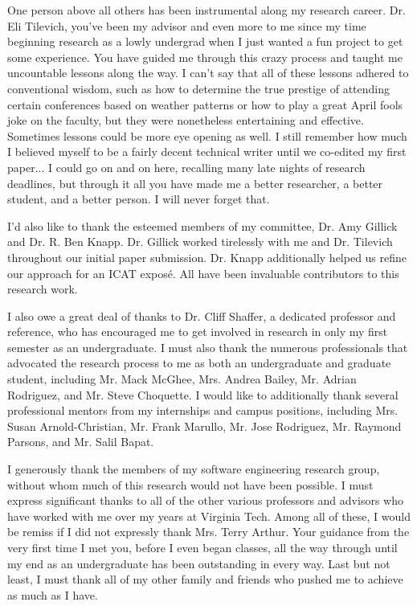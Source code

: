 \documentclass[12pt]{report}
\begin{document}
One person above all others has been instrumental along my research career. Dr. Eli Tilevich, you've been my advisor and even more to me since my time beginning research as a lowly undergrad when I just wanted a fun project to get some experience. You have guided me through this crazy process and taught me uncountable lessons along the way. I can't say that all of these lessons adhered to conventional wisdom, such as how to determine the true prestige of attending certain conferences based on weather patterns or how to play a great April fools joke on the faculty, but they were nonetheless entertaining and effective. Sometimes lessons could be more eye opening as well. I still remember how much I believed myself to be a fairly decent technical writer until we co-edited my first paper... I could go on and on here, recalling many late nights of research deadlines, but through it all you have made me a better researcher, a better student, and a better person. I will never forget that.

I'd also like to thank the esteemed members of my committee, Dr. Amy Gillick and Dr. R. Ben Knapp. Dr. Gillick worked tirelessly with me and Dr. Tilevich throughout our initial paper submission. Dr. Knapp additionally helped us refine our approach for an ICAT expos\'e. All have been invaluable contributors to this research work.

I also owe a great deal of thanks to Dr. Cliff Shaffer, a dedicated professor and reference, who has encouraged me to get involved in research in only my first semester as an undergraduate. I must also thank the numerous professionals that advocated the research process to me as both an undergraduate and graduate student, including Mr. Mack McGhee, Mrs. Andrea Bailey, Mr. Adrian Rodriguez, and Mr. Steve Choquette. I would like to additionally thank several professional mentors from my internships and campus positions, including Mrs. Susan Arnold-Christian, Mr. Frank Marullo, Mr. Jose Rodriguez, Mr. Raymond Parsons, and Mr. Salil Bapat.

I generously thank the members of my software engineering research group, without whom much of this research would not have been possible. I must express significant thanks to all of the other various professors and advisors who have worked with me over my years at Virginia Tech. Among all of these, I would be remiss if I did not expressly thank Mrs. Terry Arthur. Your guidance from the very first time I met you, before I even began classes, all the way through until my end as an undergraduate has been outstanding in every way. Last but not least, I must thank all of my other family and friends who pushed me to achieve as much as I have.
\end{document}
